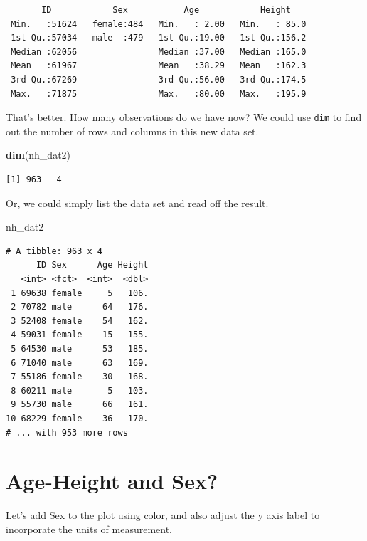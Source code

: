 \documentclass[
]{book}
\newenvironment{Shaded}{\begin{snugshade}}{\end{snugshade}}
\newcommand{\KeywordTok}[1]{\textcolor[rgb]{0.13,0.29,0.53}{\textbf{#1}}}
\newcommand{\NormalTok}[1]{#1}
\begin{document}
\begin{verbatim}
       ID            Sex           Age            Height     
 Min.   :51624   female:484   Min.   : 2.00   Min.   : 85.0  
 1st Qu.:57034   male  :479   1st Qu.:19.00   1st Qu.:156.2  
 Median :62056                Median :37.00   Median :165.0  
 Mean   :61967                Mean   :38.29   Mean   :162.3  
 3rd Qu.:67269                3rd Qu.:56.00   3rd Qu.:174.5  
 Max.   :71875                Max.   :80.00   Max.   :195.9  
\end{verbatim}

That's better. How many observations do we have now? We could use \texttt{dim} to find out the number of rows and columns in this new data set.

\begin{Shaded}
\begin{Highlighting}[]
\KeywordTok{dim}\NormalTok{(nh_dat2)}
\end{Highlighting}
\end{Shaded}

\begin{verbatim}
[1] 963   4
\end{verbatim}

Or, we could simply list the data set and read off the result.

\begin{Shaded}
\begin{Highlighting}[]
\NormalTok{nh_dat2}
\end{Highlighting}
\end{Shaded}

\begin{verbatim}
# A tibble: 963 x 4
      ID Sex      Age Height
   <int> <fct>  <int>  <dbl>
 1 69638 female     5   106.
 2 70782 male      64   176.
 3 52408 female    54   162.
 4 59031 female    15   155.
 5 64530 male      53   185.
 6 71040 male      63   169.
 7 55186 female    30   168.
 8 60211 male       5   103.
 9 55730 male      66   161.
10 68229 female    36   170.
# ... with 953 more rows
\end{verbatim}

\hypertarget{age-height-and-sex}{%
\section{Age-Height and Sex?}\label{age-height-and-sex}}

Let's add Sex to the plot using color, and also adjust the y axis label to incorporate the units of measurement.
\end{document}
